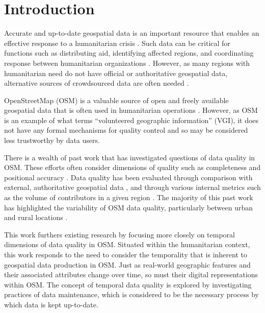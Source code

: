\chapter{Introduction}
\label{chapterlabel1}

Accurate and up-to-date geospatial data is an important resource that enables an effective response to a humanitarian crisis \parencite{cowan_geospatial_2011, poser_volunteered_2010, soden_infrastructure_2016, zook_volunteered_2010}. Such data can be critical for functions such as distributing aid, identifying affected regions, and coordinating response between humanitarian organizations \parencite{soden_infrastructure_2016}. However, as many regions with humanitarian need do not have official or authoritative geospatial data, alternative sources of crowdsourced data are often needed \parencite{zook_volunteered_2010}. 

OpenStreetMap (OSM) is a valuable source of open and freely available geospatial data that is often used in humanitarian operations \parencite{palen_success_2015, soden_infrastructure_2016}. However, as OSM is an example of what \textcite{goodchild_citizens_2007} terms “volunteered geographic information” (VGI), it does not have any formal mechanisms for quality control and so may be considered less trustworthy by data users. 

There is a wealth of past work that has investigated questions of data quality in OSM. These efforts often consider dimensions of quality such as completeness and positional accuracy \parencite{girres_quality_2010, haklay_how_2010}. Data quality has been evaluated through comparison with external, authoritative geospatial data \parencite{girres_quality_2010, haklay_how_2010, zielstra_comparative_2010}, and through various internal metrics such as the volume of contributors in a given region \parencite{haklay_how_2010-1}. The majority of this past work has highlighted the variability of OSM data quality, particularly between urban and rural locations \parencite{zielstra_comparative_2010}. 

This work furthers existing research by focusing more closely on temporal dimensions of data quality in OSM. Situated within the humanitarian context, this work responds to the need to consider the temporality that is inherent to geospatial data production in OSM. Just as real-world geographic features and their associated attributes change over time, so must their digital representations within OSM. The concept of temporal data quality is explored by investigating practices of data maintenance, which is considered to be the necessary process by which data is kept up-to-date. 


